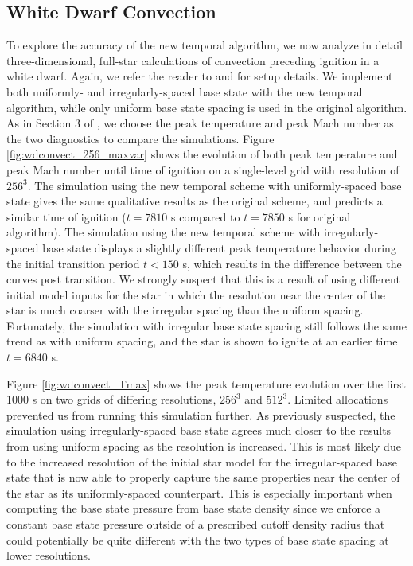 \subsection{White Dwarf Convection}\label{sec:whitedwarf}

To explore the accuracy of the new temporal algorithm, we now analyze in detail three-dimensional, full-star calculations of convection preceding ignition in a white dwarf. Again, we refer the reader to \cite{MAESTRO_AMR} and \cite{MAESTRO_convection} for setup details. We implement both uniformly- and irregularly-spaced base state with the new temporal algorithm, while only uniform base state spacing is used in the original algorithm. As in Section 3 of \cite{MAESTRO_AMR}, we choose the peak temperature and peak Mach number as the two diagnostics to compare the simulations. Figure \ref{fig:wdconvect_256_maxvar} shows the evolution of both peak temperature and peak Mach number until time of ignition on a single-level grid with resolution of $256^3$. The simulation using the new temporal scheme with uniformly-spaced base state gives the same qualitative results as the original scheme, and predicts a similar time of ignition ($t=7810$ s compared to $t=7850$ s for original algorithm). The simulation using the new temporal scheme with irregularly-spaced base state displays a slightly different peak temperature behavior during the initial transition period $t<150$ s, which results in the difference between the curves post transition. We strongly suspect that this is a result of using different initial model inputs for the star in which the resolution near the center of the star is much coarser with the irregular spacing than the uniform spacing. Fortunately, the simulation with irregular base state spacing still follows the same trend as with uniform spacing, and the star is shown to ignite at an earlier time $t=6840$ s.

Figure \ref{fig:wdconvect_Tmax} shows the peak temperature evolution over the first 1000 s on two grids of differing resolutions, $256^3$ and $512^3$. Limited allocations prevented us from running this simulation further.
As previously suspected, the simulation using irregularly-spaced base state agrees much closer to the results from using uniform spacing as the resolution is increased. This is most likely due to the increased resolution of the initial star model for the irregular-spaced base state that is now able to properly capture the same properties near the center of the star as its uniformly-spaced counterpart. This is especially important when computing the base state pressure from base state density since we enforce a constant base state pressure outside of a prescribed cutoff density radius that could potentially be quite different with the two types of base state spacing at lower resolutions.

